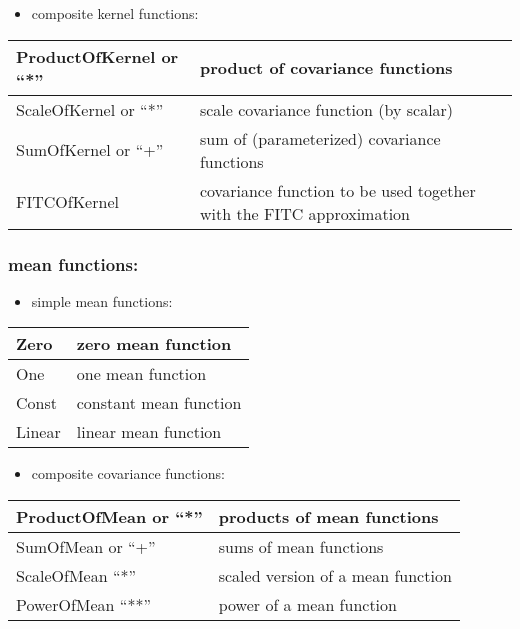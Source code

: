 \documentclass[letterpaper,10pt,english]{sphinxmanual}
\begin{document}
\begin{itemize}
\item {} 
composite kernel functions:

\end{itemize}

\begin{tabulary}{\linewidth}{|L|L|}
\hline

ProductOfKernel or ``*''
 & 
product of covariance functions
\\\hline

ScaleOfKernel or ``*''
 & 
scale covariance function (by scalar)
\\\hline

SumOfKernel or ``+''
 & 
sum of (parameterized) covariance functions
\\\hline

FITCOfKernel
 & 
covariance function to be used together with the FITC approximation
\\\hline
\end{tabulary}



\subsubsection{mean functions:}
\label{functionality:mean-functions}\begin{itemize}
\item {} 
simple mean functions:

\end{itemize}

\begin{tabulary}{\linewidth}{|L|L|}
\hline

Zero
 & 
zero mean function
\\\hline

One
 & 
one mean function
\\\hline

Const
 & 
constant mean function
\\\hline

Linear
 & 
linear mean function
\\\hline
\end{tabulary}

\begin{itemize}
\item {} 
composite covariance functions:

\end{itemize}

\begin{tabulary}{\linewidth}{|L|L|}
\hline

ProductOfMean or ``*''
 & 
products of mean functions
\\\hline

SumOfMean or ``+''
 & 
sums of mean functions
\\\hline

ScaleOfMean ``*''
 & 
scaled version of a mean function
\\\hline

PowerOfMean ``**''
 & 
power of a mean function
\\\hline
\end{tabulary}
\end{document}
